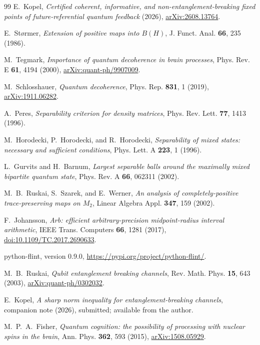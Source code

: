 \documentclass[11pt,a4paper]{article}
\theoremstyle{definition}
\theoremstyle{remark}
\begin{document}
\begin{thebibliography}{99}
 E.~Kopel,
\emph{Certified coherent, informative, and non-entanglement-breaking fixed points of future-referential quantum feedback} (2026),
\href{https://arxiv.org/abs/2608.13764}{arXiv:2608.13764}.

 E.~St\o rmer,
\emph{Extension of positive maps into $B(H)$},
J. Funct. Anal. \textbf{66}, 235 (1986).

 M.~Tegmark,
\emph{Importance of quantum decoherence in brain processes}, Phys. Rev. E \textbf{61}, 4194 (2000),
\href{https://arxiv.org/abs/quant-ph/9907009}{arXiv:quant-ph/9907009}.

 M.~Schlosshauer,
\emph{Quantum decoherence}, Phys. Rep. \textbf{831}, 1 (2019),
\href{https://arxiv.org/abs/1911.06282}{arXiv:1911.06282}.

 A.~Peres,
\emph{Separability criterion for density matrices},
Phys. Rev. Lett. \textbf{77}, 1413 (1996).

 M.~Horodecki, P.~Horodecki, and R.~Horodecki,
\emph{Separability of mixed states: necessary and sufficient conditions},
Phys. Lett. A \textbf{223}, 1 (1996).

 L.~Gurvits and H.~Barnum,
\emph{Largest separable balls around the maximally mixed bipartite quantum
state},
Phys. Rev. A \textbf{66}, 062311 (2002).

 M.~B.~Ruskai, S.~Szarek, and E.~Werner,
\emph{An analysis of completely-positive trace-preserving maps on $M_2$},
Linear Algebra Appl. \textbf{347}, 159 (2002).

 F.~Johansson,
\emph{Arb: efficient arbitrary-precision midpoint-radius interval arithmetic}, IEEE Trans. Computers \textbf{66}, 1281 (2017),
\href{https://doi.org/10.1109/TC.2017.2690633}{doi:10.1109/TC.2017.2690633}.

 python-flint, version 0.9.0,
\url{https://pypi.org/project/python-flint/}.

 M.~B.~Ruskai,
\emph{Qubit entanglement breaking channels}, Rev. Math. Phys. \textbf{15}, 643 (2003),
\href{https://arxiv.org/abs/quant-ph/0302032}{arXiv:quant-ph/0302032}.

 E.~Kopel,
\emph{A sharp norm inequality for entanglement-breaking channels}, companion note (2026), submitted; available from the author.

 M.~P.~A.~Fisher,
\emph{Quantum cognition: the possibility of processing with nuclear spins in the brain}, Ann. Phys. \textbf{362}, 593 (2015),
\href{https://arxiv.org/abs/1508.05929}{arXiv:1508.05929}.


\end{thebibliography}
\end{document}
